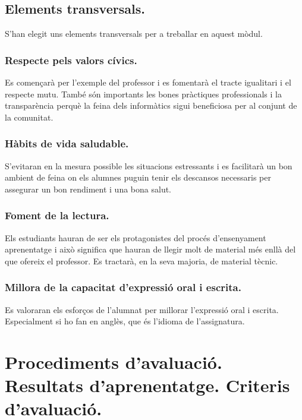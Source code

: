 \documentclass[catalan, a4paper, 12pt, titlepage]{article}
\begin{document}
\subsection{Elements transversals.}

S'han elegit uns elements transversals per a treballar en aquest mòdul.

\subsubsection{Respecte pels valors cívics.}

Es començarà per l'exemple del professor i es fomentarà el tracte igualitari i el respecte mutu. També són importants les bones pràctiques professionals i la transparència perquè la feina dels informàtics sigui beneficiosa per al conjunt de la comunitat.

\subsubsection{Hàbits de vida saludable.}

S'evitaran en la mesura possible les situacions estressants i es facilitarà un bon ambient de feina on els alumnes puguin tenir els descansos necessaris per assegurar un bon rendiment i una bona salut.

\subsubsection{Foment de la lectura.}

Els estudiants hauran de ser els protagonistes del procés d'ensenyament aprenentatge i això significa que hauran de llegir molt de material més enllà del que ofereix el professor. Es tractarà, en la seva majoria, de material tècnic.

\subsubsection{Millora de la capacitat d'expressió oral i escrita.}

Es valoraran els esforços de l'alumnat per millorar l'expressió oral i escrita. Especialment si ho fan en anglès, que és l'idioma de l'assignatura.

\section{Procediments d'avaluació. Resultats d'aprenentatge. Criteris d'avaluació.}
\label{sec:procediments}
\end{document}
